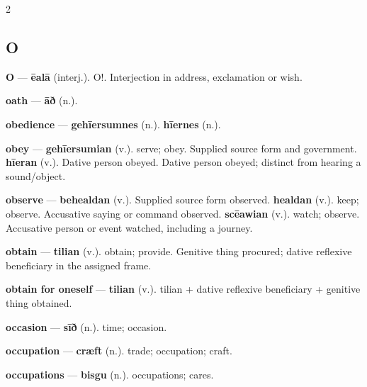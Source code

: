\begin{multicols}{2}
\subsection*{O}
\textbf{O} — \textbf{ēalā} (interj.). O!. Interjection in address, exclamation or wish.\par
\textbf{oath} — \textbf{āð} (n.).\par
\textbf{obedience} — \textbf{gehīersumnes} (n.).  \textbf{hīernes} (n.).\par
\textbf{obey} — \textbf{gehīersumian} (v.). serve; obey. Supplied source form and government. \textbf{hīeran} (v.). Dative person obeyed. Dative person obeyed; distinct from hearing a sound/object.\par
\textbf{observe} — \textbf{behealdan} (v.). Supplied source form observed. \textbf{healdan} (v.). keep; observe. Accusative saying or command observed. \textbf{scēawian} (v.). watch; observe. Accusative person or event watched, including a journey.\par
\textbf{obtain} — \textbf{tilian} (v.). obtain; provide. Genitive thing procured; dative reflexive beneficiary in the assigned frame.\par
\textbf{obtain for oneself} — \textbf{tilian} (v.). tilian + dative reflexive beneficiary + genitive thing obtained.\par
\textbf{occasion} — \textbf{sīð} (n.). time; occasion.\par
\textbf{occupation} — \textbf{cræft} (n.). trade; occupation; craft.\par
\textbf{occupations} — \textbf{bisgu} (n.). occupations; cares.\par

\end{multicols}
